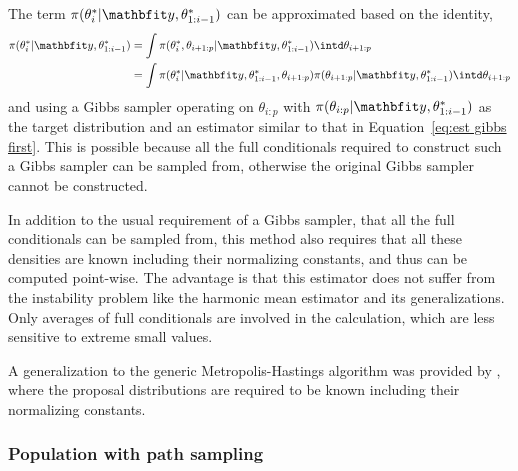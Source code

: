 The term $\pi(\theta_i^*|\data,\theta_{1:i-1}^*)$ can be approximated based on
the identity,
\begin{align}
  \pi(\theta_i^*|\data,\theta_{1:i-1}^*)
  &= \int \pi(\theta_i^*,\theta_{i+1:p}|\data,\theta_{1:i-1}^*)
  \intd\theta_{i+1:p} \notag\\
  &= \int \pi(\theta_i^*|\data,\theta_{1:i-1}^*,\theta_{i+1:p})
  \pi(\theta_{i+1:p}|\data,\theta_{1:i-1}^*) \intd\theta_{i+1:p}
\end{align}
and using a Gibbs sampler operating on $\theta_{i:p}$ with
$\pi(\theta_{i:p}|\data,\theta_{1:i-1}^*)$ as the target distribution and an
estimator similar to that in Equation~\eqref{eq:est gibbs first}. This is
possible because all the full conditionals required to construct such a Gibbs
sampler can be sampled from, otherwise the original Gibbs sampler cannot be
constructed.

In addition to the usual requirement of a Gibbs sampler, that all the full
conditionals can be sampled from, this method also requires that all these
densities are known including their normalizing constants, and thus can be
computed point-wise. The advantage is that this estimator does not suffer
from the instability problem like the harmonic mean estimator and its
generalizations. Only averages of full conditionals are involved in the
calculation, which are less sensitive to extreme small values.

A generalization to the generic Metropolis-Hastings algorithm was provided by
\cite{Chib:2001gq}, where the proposal distributions are required to be
known including their normalizing constants.

\subsubsection{Population \mcmc with path sampling}
\label{ssub:Population mcmc with path sampling}

